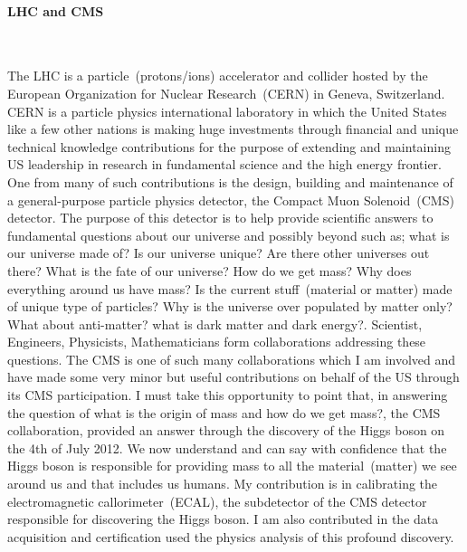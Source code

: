 \documentclass[12pt]{article}
\begin{document}
\paragraph*{LHC and CMS} \mbox{}\\
\par
The LHC is a particle~(protons/ions) accelerator and collider hosted by the European Organization for Nuclear Research~(CERN) in Geneva, Switzerland. CERN is a particle physics international laboratory  in which the United States like a few other nations is making  huge investments through financial and unique technical knowledge contributions for the purpose of extending and maintaining US leadership in research in fundamental science and the high energy frontier. One from many of such contributions is the design, building and maintenance of a general-purpose particle physics detector, the Compact Muon Solenoid~(CMS) detector. The purpose of this detector is to help provide scientific answers to fundamental questions about our universe and possibly beyond such as; what is our universe made of? Is our universe unique? Are there other universes out there? What is the fate of our universe? How do we get mass? Why does everything around us have mass? Is the current stuff~(material or matter) made of unique type of particles? Why is the universe over populated by matter only? What about anti-matter? what is dark matter and dark energy?.
Scientist, Engineers, Physicists, Mathematicians form collaborations addressing these questions. The CMS is one of such many collaborations which I am involved and have made some very minor but useful contributions on behalf of the US through its CMS participation. I must take this opportunity to point that, in answering the question of what is the origin of mass and how do we get mass?, the CMS collaboration, provided an answer through the discovery of the Higgs boson on the 4th of July 2012. We now understand and can say with confidence that the Higgs boson is responsible for providing mass to all the material~(matter) we see around us and that includes us humans. My contribution  is in calibrating the electromagnetic callorimeter~(ECAL), the subdetector of the CMS detector responsible for discovering the Higgs boson. I am also contributed in the data acquisition and certification used the physics analysis of this profound discovery.
\end{document}
